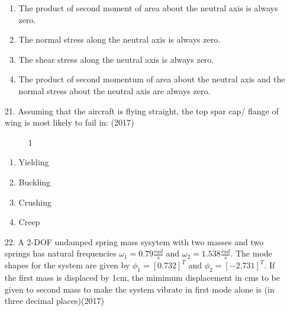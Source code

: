 \documentclass[journal]{IEEEtran}
\begin{document}
\begin{enumerate}
    \begin{enumerate}[label=(\Alph*)]
        \item The product of second moment of area about the neutral axis is always zero.
        \item The normal stress along the neutral axis is always zero.
        \item The shear stress along the neutral axis is always zero.
        \item The product of second momentum of area about the neutral axis and the normal stress about the neutral axis are always zero.
    \end{enumerate}
    \item[21.] Assuming that the aircraft is flying straight, the top spar cap/ flange of wing is most likely to fail in: \hfill (2017)
    \begin{figure}[!ht]
        \centering
        \caption{1}
    \end{figure}
    \begin{enumerate}[label=(\Alph*)]
        \item  Yielding
        \item  Buckling 
        \item  Crushing
        \item  Creep
    \end{enumerate} 
    
    \item[22.] A 2-DOF undamped spring mass sysytem with two masses and two springs has natural frequencies $\omega_1 = 0.79\frac{rad}{s}$ and $\omega_2 = 1.538\frac{rad}{s}$. The mode shapes for the system are given by $\phi_1 = [0.732]^T$ and $\phi_2 = [-2.731]^T$. If the first mass is displaced by 1cm, the mimimum displacement in cms to be given to second mass to make the system vibrate in first mode alone is  (in three decimal places)\hfill (2017)
    

\end{enumerate}
\end{document}

